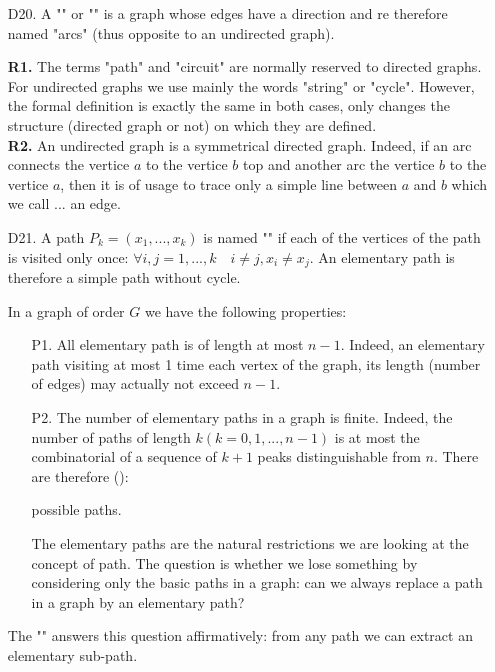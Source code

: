 {\begin{enumerate}
	\item[D20.] A "" or "\label{oriented graph}" is a graph whose edges have a direction and re therefore named "arcs" (thus opposite to an undirected graph).
	
	\begin{tcolorbox}[title=Remarks,colframe=black,arc=10pt]
	\textbf{R1.} The terms "path" and "circuit" are normally reserved to directed graphs. For undirected graphs we use mainly the words "string" or "cycle". However, the formal definition is exactly the same in both cases, only changes the structure (directed graph or not) on which they are defined.\\
	
	\textbf{R2.} An undirected graph is a symmetrical directed graph. Indeed, if an arc connects the vertice $a$ to the vertice $b$ top and another arc the vertice $b$ to the vertice $a$, then it is of usage to trace only a simple line between $a$ and $b$ which we call ... an edge.
	\end{tcolorbox}
	
	 \item[D21.] A path $P_k=(x_1,...,x_k)$ is named "" if each of the vertices of the path is visited only once: $\forall i,j=1,...,k \quad i\neq j,x_i \neq x_j$. An elementary path is therefore a simple path without cycle.
	 
	 In a graph of order $G$ we have the following properties:
	 \begin{enumerate}
	 	\item[P1.] All elementary path is of length at most $n-1$. Indeed, an elementary path visiting at most 1 time each vertex of the graph, its length (number of edges) may actually not exceed $n-1$.
	 	
	 	\item[P2.] The number of elementary paths in a graph is finite. Indeed, the number of paths of length $k(k=0,1,...,n-1)$ is at most the combinatorial of a sequence of $k + 1$ peaks distinguishable from $n$. There are therefore ():
	 	
		possible paths.
		
		The elementary paths are the natural restrictions we are looking at the concept of path. The question is whether we lose something by considering only the basic paths in a graph: can we always replace a path in a graph by an elementary path?
	 \end{enumerate}
	 \begin{lemma}
	 The "" answers this question affirmatively: from any path we can extract an elementary sub-path.
	 

\end{lemma}
\end{enumerate}}
